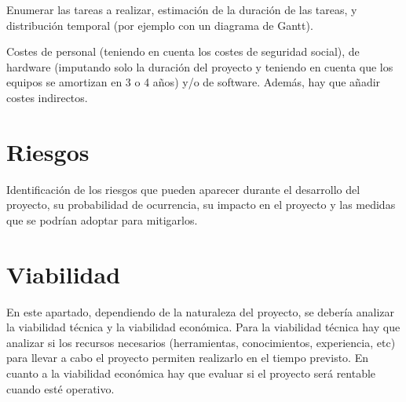 Enumerar las tareas a realizar, estimación de la duración de las tareas, y
distribución temporal (por ejemplo con un diagrama de Gantt).

Costes de personal (teniendo en cuenta los costes de seguridad
social), de hardware (imputando solo la duración del proyecto y teniendo
en cuenta que los equipos se amortizan en 3 o 4 años) y/o de software.
Además, hay que añadir costes indirectos.

\section{Riesgos}

Identificación de los riesgos que pueden aparecer durante el
desarrollo del proyecto, su probabilidad de ocurrencia, su impacto en
el proyecto y las medidas que se podrían adoptar para mitigarlos.

\section{Viabilidad}
En este apartado, dependiendo de la naturaleza del proyecto, se
debería analizar la viabilidad técnica y la viabilidad económica. Para
la viabilidad técnica hay que analizar si los recursos
necesarios (herramientas, conocimientos, experiencia, etc)  para llevar
a cabo el proyecto permiten realizarlo en el tiempo previsto.
En cuanto a la viabilidad económica hay que evaluar si el proyecto
será rentable cuando esté operativo.